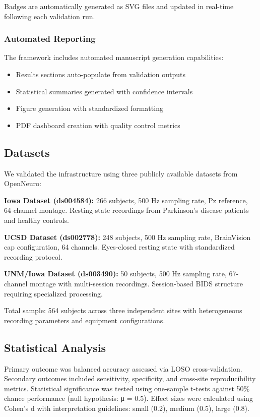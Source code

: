 \documentclass[11pt]{article}
\begin{document}
Badges are automatically generated as SVG files and updated in real-time following each validation run.

\subsubsection{Automated Reporting}

The framework includes automated manuscript generation capabilities:
\begin{itemize}
\item Results sections auto-populate from validation outputs
\item Statistical summaries generated with confidence intervals
\item Figure generation with standardized formatting
\item PDF dashboard creation with quality control metrics
\end{itemize}

\subsection{Datasets}

We validated the infrastructure using three publicly available datasets from OpenNeuro:

\textbf{Iowa Dataset (ds004584):} 266 subjects, 500 Hz sampling rate, Pz reference, 64-channel montage. Resting-state recordings from Parkinson's disease patients and healthy controls.

\textbf{UCSD Dataset (ds002778):} 248 subjects, 500 Hz sampling rate, BrainVision cap configuration, 64 channels. Eyes-closed resting state with standardized recording protocol.

\textbf{UNM/Iowa Dataset (ds003490):} 50 subjects, 500 Hz sampling rate, 67-channel montage with multi-session recordings. Session-based BIDS structure requiring specialized processing.

Total sample: 564 subjects across three independent sites with heterogeneous recording parameters and equipment configurations.

\subsection{Statistical Analysis}

Primary outcome was balanced accuracy assessed via LOSO cross-validation. Secondary outcomes included sensitivity, specificity, and cross-site reproducibility metrics. Statistical significance was tested using one-sample t-tests against 50\% chance performance (null hypothesis: μ = 0.5). Effect sizes were calculated using Cohen's d with interpretation guidelines: small (0.2), medium (0.5), large (0.8).
\end{document}
